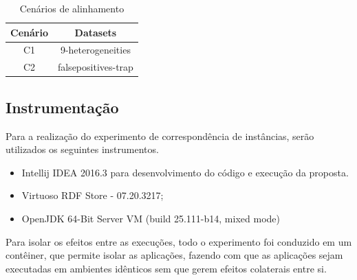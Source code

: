 \begin{table}[h]
	\centering
	\caption{Cenários de alinhamento}
	\label{tab:cenarios}
	\begin{tabular}{|c|c|}
		\hline
		\textbf{Cenário} & \textbf{Datasets}          \\ \hline
		C1               & 9-heterogeneities          \\ \hline
		C2               & falsepositives-trap        \\ \hline
	\end{tabular}
\end{table}

\subsection{Instrumentação}
Para a realização do experimento de correspondência de instâncias, serão utilizados os seguintes instrumentos.

\begin{itemize}
\item Intellij IDEA 2016.3 para desenvolvimento do código e execução da proposta.
\item Virtuoso RDF Store - 07.20.3217;
\item OpenJDK 64-Bit Server VM (build 25.111-b14, mixed mode)
\end{itemize}

Para isolar os efeitos entre as execuções, todo o experimento foi conduzido em um contêiner, que permite isolar as aplicações, fazendo com que as aplicações sejam executadas em ambientes idênticos sem que gerem efeitos colaterais entre si.

